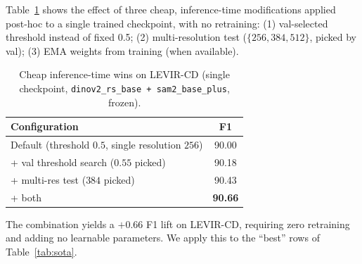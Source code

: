 Table~\ref{tab:cheap} shows the effect of three cheap, inference-time
modifications applied post-hoc to a single trained checkpoint, with no
retraining: (1) val-selected threshold instead of fixed 0.5; (2)
multi-resolution test ($\{256, 384, 512\}$, picked by val); (3) EMA
weights from training (when available).

\begin{table}[h]
  \centering
  \small
  \caption{Cheap inference-time wins on LEVIR-CD (single checkpoint,
    \texttt{dinov2\_rs\_base + sam2\_base\_plus}, frozen).}
  \label{tab:cheap}
  \begin{tabular}{lc}
    \toprule
    Configuration & F1 \\
    \midrule
    Default (threshold $0.5$, single resolution $256$) & 90.00 \\
    + val threshold search ($0.55$ picked) & 90.18 \\
    + multi-res test ($384$ picked) & 90.43 \\
    + both                                            & \textbf{90.66} \\
    \bottomrule
  \end{tabular}
\end{table}

The combination yields a $+0.66$ F1 lift on LEVIR-CD, requiring zero
retraining and adding no learnable parameters. We apply this to the
``best'' rows of Table~\ref{tab:sota}.

